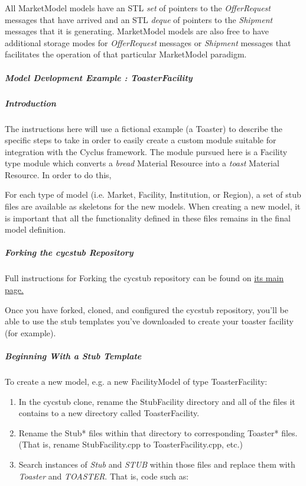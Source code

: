 \documentclass[letterpaper,10pt,english]{sphinxmanual}
\begin{document}
All MarketModel models have an STL \emph{set} of pointers to the \emph{OfferRequest}
messages that have arrived and an STL \emph{deque} of pointers to the \emph{Shipment}
messages that it is generating.  MarketModel models are also free to have
additional storage modes for \emph{OfferRequest} messages or \emph{Shipment} messages
that facilitates the operation of that particular MarketModel paradigm.


\subparagraph{Model Devlopment Example : ToasterFacility}
\label{devdoc/make-models/toaster:model-devlopment-example-toasterfacility}\label{devdoc/make-models/toaster::doc}

\subparagraph{Introduction}
\label{devdoc/make-models/toaster:introduction}
The instructions here will use a fictional example (a Toaster) to describe the
specific steps to take in order to easily create a custom module suitable for
integration with the Cyclus framework. The module pursued here is a Facility
type module which converts a \emph{bread} Material Resource into a \emph{toast} Material
Resource. In order to do this,

For each type of model (i.e. Market, Facility, Institution, or Region), a set of
stub files are available as skeletons for the new models.  When creating a new
model, it is important that all the functionality defined in these files remains
in the final model definition.


\subparagraph{Forking the cycstub Repository}
\label{devdoc/make-models/toaster:forking-the-cycstub-repository}
Full instructions for Forking the cycstub repository can be found on \href{https://github.com/cyclus/cycstub}{its main
page.}

Once you have forked, cloned, and configured the cycstub repository, you'll be
able to use the stub templates you've downloaded to create your toaster
facility (for example).


\subparagraph{Beginning With a Stub Template}
\label{devdoc/make-models/toaster:beginning-with-a-stub-template}
To create a new model, e.g. a new FacilityModel of type ToasterFacility:
\begin{enumerate}
\item {} 
In the cycstub clone, rename the StubFacility directory and all of the files
it contains to a new directory called ToasterFacility.

\item {} 
Rename the Stub* files within that directory to corresponding Toaster* files.
(That is, rename StubFacility.cpp to ToasterFacility.cpp, etc.)

\item {} 
Search instances of \emph{Stub} and \emph{STUB} within those files and replace them
with \emph{Toaster} and \emph{TOASTER}. That is, code such as:

\end{enumerate}
\end{document}
